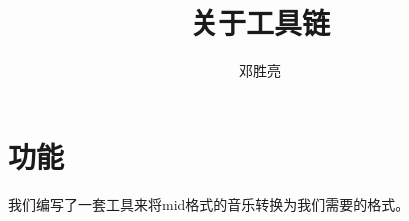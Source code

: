 \documentclass[UTF8]{ctexart}
\title{关于工具链}
\author{邓胜亮}
\begin{document}
  \maketitle
  \section{功能}
    我们编写了一套工具来将mid格式的音乐转换为我们需要的格式。
\end{document}

